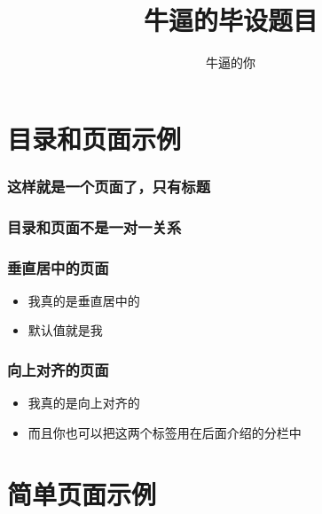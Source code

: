 


\title{牛逼的毕设题目}
\author{牛逼的你}


\CTEXnoindent

    


    \section{目录和页面示例} %

    \begin{frame}
        \frametitle{这样就是一个页面了，只有标题}
    \end{frame}

    \begin{frame}
        \frametitle{目录和页面不是一对一关系}
    \end{frame}

    \begin{frame}[c]
        \frametitle{垂直居中的页面}
        \begin{itemize}
            \item 我真的是垂直居中的
            \item 默认值就是我
        \end{itemize}
    \end{frame}

    \begin{frame}[t]
        \frametitle{向上对齐的页面}
        \begin{itemize}
            \item 我真的是向上对齐的
            \item 而且你也可以把这两个标签用在后面介绍的分栏中
        \end{itemize}
    \end{frame}

    \section{简单页面示例}

